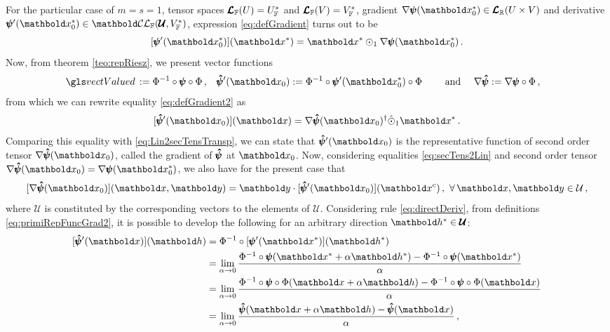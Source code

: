 For the particular case of $m=s=1$, tensor spaces $\pmb{\mathcal{L}}_{\mathbb{F}}(U)=U^*_{\mathbb{F}}$ and $\pmb{\mathcal{L}}_{\mathbb{F}}(V)=V^*_{\mathbb{F}}$, gradient $\fua{\nabla\tnr{\psi}}{\vto{x}_0^*}\in\ete{\cam{R}}{U\times V}$ and derivative $\fua{\tnr{\psi}'}{\vto{x}_0^*}\in\evlc{\cam{F}}{\pmb{\mathcal{U}}}{V^*_\cam{F}}$, expression \eqref{eq:defGradient} turns out to be
\begin{equation}\label{eq:defGradient2}
[\fua{\tnr{\psi}'}{\vto{x}_0^*}](\vto{x}^*) = \vto{x}^*\odot_1\fua{\nabla\tnr{\psi}}{\vto{x}_0^*}\,.
\end{equation}
Now, from theorem \ref{teo:repRiesz}, we present vector functions
\begin{alignat}{4} \label{eq:primiRepFuncGrad2}
\gloref{vectValued}:=\Phi^{-1}\circ\tnr{\psi}\circ\Phi\,, &\quad   \tnr{\hat\psi}'(\vto{x}_0):=\Phi^{-1}\circ\fua{\tnr{\psi}'}{\vto{x}_0^*}\circ\Phi  &\quad \text{ and } \quad& \nabla\tnr{\hat{\psi}}:=\nabla\tnr{\psi}\circ\Phi \,,
\end{alignat}
from which we can rewrite equality \eqref{eq:defGradient2} as
\begin{equation}\label{eq:derivVecGradVec}
\fua{[\tnr{\hat\psi}'(\vto{x}_0)]}{\vto{x}} = \fua{ \nabla\tnr{\hat{\psi}}}{\vto{x}_0}^\dagger\hat{\odot}_1\vto{x}^*\,.
\end{equation}
Comparing this equality with \eqref{eq:Lin2secTensTransp}, we can state that $\tnr{\hat\psi}'(\vto{x}_0)$ is the representative function of second order tensor $\fua{ \nabla\tnr{\hat{\psi}}}{\vto{x}_0}$, called the gradient of  $\pmb{\hat{\psi}}$ at $\vto{x}_0$. Now, considering equalities \eqref{eq:secTens2Lin} and second order tensor $\fua{\nabla\tnr{\hat{\psi}}}{\vto{x}_0}=\fua{\nabla\tnr{\psi}}{\vto{x}_0^*}$, we also have for the present case that 
\begin{equation}\label{eq:gradFuncRep}
\fua{[\fua{\nabla\tnr{\hat{\psi}}}{\vto{x}_0}]}{\vto{x},\vto{y}}=\vto{y}\cdot\fua{[\tnr{\hat\psi}'(\vto{x}_0)]}{\vto{x}^{c}}\,,\,\,\forall\, \vto{x},\vto{y}\in\mathcal{U}\,,
\end{equation}
where $\mathcal{U}$ is constituted by the corresponding vectors to the elements of $\pmb{\mathcal{U}}$. Considering rule \eqref{eq:directDeriv}, from  definitions \eqref{eq:primiRepFuncGrad2}, it is possible to develop the following for an arbitrary direction $\vto{h}^*\in\pmb{\mathcal{U}}$:  
\begin{align}\label{eq:derivRep}
\fua{[\tnr{\hat\psi}'(\vto{x})]}{\vto{h}}&=\Phi^{-1}\circ\fua{[\fua{\tnr{\psi}'}{\vto{x}^*}]}{\vto{h}^*}\nonumber\\
&=\lim_{\alpha\to 0} \dfrac{\fua{\Phi^{-1}\circ\tnr{\psi}}{\vto{x}^*+\alpha\vto{h}^*}-\fua{\Phi^{-1}\circ\tnr{\psi}}{\vto{x}^*}}{\alpha}\nonumber\\
&=\lim_{\alpha\to 0} \dfrac{\fua{\Phi^{-1}\circ\tnr{\psi}\circ\Phi}{\vto{x}+\alpha\vto{h}}-\fua{\Phi^{-1}\circ\tnr{\psi}\circ\Phi}{\vto{x}}}{\alpha}\nonumber\\
&=\lim_{\alpha\to 0} \dfrac{\fua{\tnr{\hat\psi}}{\vto{x}+\alpha\vto{h}}-\fua{\tnr{\hat\psi}}{\vto{x}}}{\alpha}\,,
\end{align}
